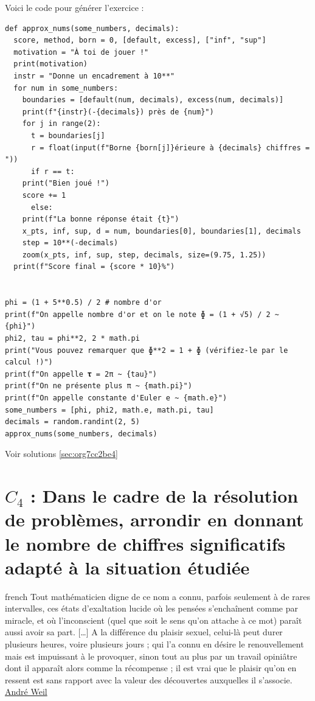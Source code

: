 \documentclass[a4paper, 11pt, twoside]{book}
\begin{document}
Voici le code pour générer l'exercice :
\begin{verbatim}
def approx_nums(some_numbers, decimals):
  score, method, born = 0, [default, excess], ["inf", "sup"]
  motivation = "À toi de jouer !"
  print(motivation)
  instr = "Donne un encadrement à 10**"
  for num in some_numbers:
    boundaries = [default(num, decimals), excess(num, decimals)]
    print(f"{instr}(-{decimals}) près de {num}")
    for j in range(2):
      t = boundaries[j]
      r = float(input(f"Borne {born[j]}érieure à {decimals} chiffres = "))
      if r == t:
	print("Bien joué !")
	score += 1
      else:
	print(f"La bonne réponse était {t}")
    x_pts, inf, sup, d = num, boundaries[0], boundaries[1], decimals
    step = 10**(-decimals)
    zoom(x_pts, inf, sup, step, decimals, size=(9.75, 1.25))
  print(f"Score final = {score * 10}%")


phi = (1 + 5**0.5) / 2 # nombre d'or
print(f"On appelle nombre d'or et on le note ɸ = (1 + √5) / 2 ~ {phi}")
phi2, tau = phi**2, 2 * math.pi
print("Vous pouvez remarquer que ɸ**2 = 1 + ɸ (vérifiez-le par le calcul !)")
print(f"On appelle 𝛕 = 2π ~ {tau}")
print(f"On ne présente plus π ~ {math.pi}")
print(f"On appelle constante d'Euler e ~ {math.e}")
some_numbers = [phi, phi2, math.e, math.pi, tau]
decimals = random.randint(2, 5)
approx_nums(some_numbers, decimals)
\end{verbatim}

Voir solutions \ref{sec:org7cc2be4}
\stopcontents[level-2]

\chapter{\(C_4\) : Dans le cadre de la résolution de problèmes, arrondir en donnant le nombre de chiffres significatifs adapté à la situation étudiée}
\label{sec:orge07749d}
\startcontents[level-2]

\begin{foreigndisplayquote}{french}
Tout mathématicien digne de ce nom a connu, parfois seulement à de
rares intervalles, ces états d’exaltation lucide où les pensées
s’enchaînent comme par miracle, et où l’inconscient (quel que soit
le sens qu’on attache à ce mot) paraît aussi avoir sa part. [\ldots{}] A
la différence du plaisir sexuel, celui-là peut durer plusieurs
heures, voire plusieurs jours ; qui l’a connu en désire le
renouvellement mais est impuissant à le provoquer, sinon tout au
plus par un travail opiniâtre dont il apparaît alors comme la
récompense ; il est vrai que le plaisir qu’on en ressent est sans
rapport avec la valeur des découvertes auxquelles il s’associe.\\

\href{https://fr.wikipedia.org/wiki/Andr\%C3\%A9\_Weil}{André Weil}
\end{foreigndisplayquote}
\end{document}
